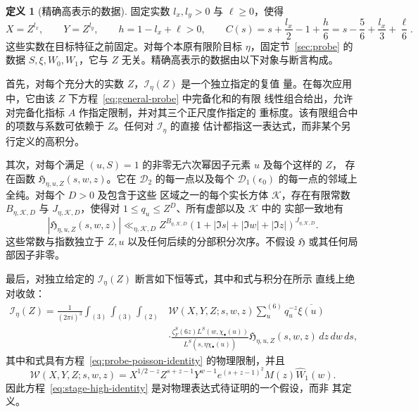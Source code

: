 \documentclass[11pt,a4paper]{article}
\numberwithin{equation}{section}
\numberwithin{figure}{section}
\theoremstyle{definition}
\newtheorem{definition}[theorem]{定义}
\theoremstyle{remark}
\begin{document}
\begin{definition}[精确高表示的数据]
\label{def:stage-high-data}
固定实数 $l_x,l_y>0$ 与 $\ell\ge0$，使得
\begin{equation}
 X=Z^{l_x},\qquad Y=Z^{l_y},\qquad h=1-l_x+\ell>0,
 \qquad
 C(s)=s+\frac{l_x}{2}-1+\frac h6
     =s-\frac56+\frac{l_x}{3}+\frac\ell6.
 \label{eq:stage-mellin-exponent}
\end{equation}
这些实数在目标特征之前固定。对每个本原有限阶目标 $\eta$，固定节~\ref{sec:probe} 的
数据 $S,\xi,W_0,W_1$，它与 $Z$ 无关。精确高表示的数据由以下对象与断言构成。

首先，对每个充分大的实数 $Z$，$\mathscr I_\eta(Z)$ 是一个独立指定的复值
量。在每次应用中，它由该 $Z$ 下方程~\eqref{eq:general-probe} 中完备化和的有限
线性组合给出，允许对完备化指标 $A$ 作指定限制，并对其三个正尺度作指定的
重标度。该有限组合中的项数与系数可依赖于 $Z$。任何对 $\mathscr I_\eta$ 的直接
估计都指这一表达式，而非某个另行定义的高积分。

其次，对每个满足 $(u,S)=1$ 的非零无六次幂因子元素 $u$ 及每个这样的 $Z$，
存在函数 $\mathfrak H_{\eta,u,Z}(s,w,z)$。它在 $\mathcal D_2$ 的每一点以及每个
$\mathcal D_1(\epsilon_0)$ 的每一点的邻域上全纯。对每个 $D>0$ 及包含于这些
区域之一的每个实长方体 $\mathcal K$，存在有限常数 $B_{\eta,\mathcal K,D}$ 与
$J_{\eta,\mathcal K,D}$，使得对 $1\le q_u\le Z^D$、所有虚部以及 $\mathcal K$ 中的
实部一致地有
\begin{equation}
 |\mathfrak H_{\eta,u,Z}(s,w,z)|
 \ll_{\eta,\mathcal K,D}
 Z^{B_{\eta,\mathcal K,D}}
 (1+|\Im s|+|\Im w|+|\Im z|)^{J_{\eta,\mathcal K,D}}.
 \label{eq:stage-all-height-majorant}
\end{equation}
这些常数与指数独立于 $Z,u$ 以及任何后续的分部积分次序。不假设 $\mathfrak H$
或其任何局部因子非零。

最后，对独立给定的 $\mathscr I_\eta(Z)$ 断言如下恒等式，其中和式与积分在所示
直线上绝对收敛：
\begin{equation}
\begin{split}
 \mathscr I_\eta(Z)=\frac1{(2\pi i)^3}
 \int_{(3)}\int_{(3)}\int_{(2)}
 &\mathcal W(X,Y,Z;s,w,z)
 \sum_u^{(6)}q_u^{-z}\overline{\xi(u)}\\
 &\cdot
 \frac{\zeta_F^S(6z)L^S(w,\chi_\bullet(u))}
      {L^S(s,\eta\overline{\chi_\bullet(u)})}
 \mathfrak H_{\eta,u,Z}(s,w,z)\,dz\,dw\,ds,
\end{split}
\label{eq:stage-high-identity}
\end{equation}
其中和式具有方程~\eqref{eq:probe-poisson-identity} 的物理限制，并且
\[
 \mathcal W(X,Y,Z;s,w,z)
 =X^{1/2-z}Z^{s+z-1}Y^{w-1}
       e^{(s+z-1)^2}M(z)\widehat W_1(w).
\]
因此方程~\eqref{eq:stage-high-identity} 是对物理表达式待证明的一个假设，而非
其定义。
\end{definition}
\end{document}

